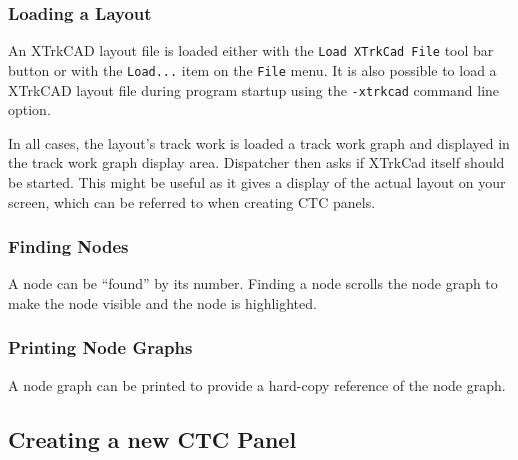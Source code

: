 \subsubsection{Loading a Layout}

An XTrkCAD layout file is loaded either with the \verb=Load XTrkCad File=
tool bar button or with the \verb=Load...= item on the \verb=File=
menu. It is also possible to load a XTrkCAD layout file during
program startup using the \verb=-xtrkcad= command line option.

In all cases, the layout's track work is loaded a track work graph and
displayed in the track work graph display area.  Dispatcher then asks if
XTrkCad itself should be started.  This might be useful as it gives a
display of the actual layout on your screen, which can be referred to
when creating CTC panels.

\subsubsection{Finding Nodes}

A node can be ``found'' by its number.  Finding a node scrolls the node
graph to make the node visible and the node is highlighted.

\subsubsection{Printing Node Graphs}

A node graph can be printed to provide a hard-copy reference of the node
graph.

\subsection{Creating a new CTC Panel}
\label{sect:dispatcher:creatingCTCPanels}

